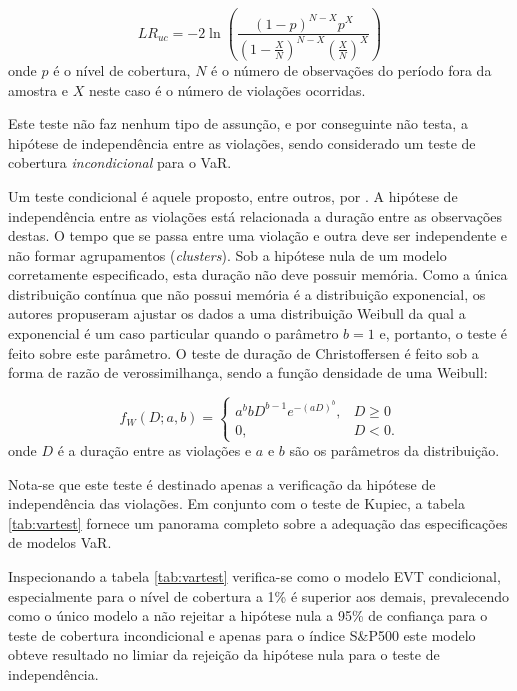 \documentclass[1p]{elsarticle}
\theoremstyle{definition}
\begin{document}
\begin{equation}
	LR_{uc}=-2\ln\left(\frac{(1-p)^{N-X}p^X}{(1-\frac{X}{N})^{N-X}(\frac{X}{N})^X}\right)
\end{equation}
onde $p$ é o nível de cobertura, $N$ é o número de observações do período fora da amostra e $X$ neste caso é o número de violações ocorridas.

Este teste não faz nenhum tipo de assunção, e por conseguinte não testa, a hipótese de independência entre as violações, sendo considerado um teste de cobertura \emph{incondicional} para o VaR.

Um teste condicional é aquele proposto, entre outros, por \cite{Christoffersen2004}. A hipótese de independência entre as violações está relacionada a duração entre as observações destas. O tempo que se passa entre uma violação e outra deve ser independente e não formar agrupamentos (\emph{clusters}). Sob a hipótese nula de um modelo corretamente especificado, esta duração não deve possuir memória. Como a única distribuição contínua que não possui memória é a distribuição exponencial, os autores propuseram ajustar os dados a uma distribuição Weibull da qual a exponencial é um caso particular quando o parâmetro $b=1$ e, portanto, o teste é feito sobre este parâmetro. O teste de duração de Christoffersen é feito sob a forma de razão de verossimilhança, sendo a função densidade de uma Weibull:

\begin{equation}
	f_W(D; a, b) = \begin{cases}
	a^b b D^{b-1}e^{-(aD)^b}, &D \geq 0\\
	0,&D<0.
	\end{cases} 
\end{equation}
onde $D$ é a duração entre as violações e $a$ e $b$ são os parâmetros da distribuição.

Nota-se que este teste é destinado apenas a verificação da hipótese de independência das violações. Em conjunto com o teste de Kupiec, a tabela \ref{tab:vartest} fornece um panorama completo sobre a adequação das especificações de modelos VaR.



Inspecionando a tabela \ref{tab:vartest} verifica-se como o modelo EVT condicional, especialmente para o nível de cobertura a 1\% é superior aos demais, prevalecendo como o único modelo a não rejeitar a hipótese nula a 95\% de confiança para o teste de cobertura incondicional e apenas para o índice S\&P500 este modelo obteve resultado no limiar da rejeição da hipótese nula para o teste de independência.
\end{document}
